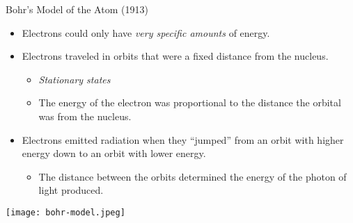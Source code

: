 \documentclass[notes]{beamer}
\begin{document}
\begin{frame}{Bohr's Model of the Atom (1913)}
	\begin{itemize}
		\item Electrons could only have \emph{very specific amounts} of
			energy.
		\item Electrons traveled in orbits that were a fixed distance
			from the nucleus.
			\begin{itemize}
				\item \emph{Stationary states}
				\item The energy of the electron was
					proportional to the distance the orbital
					was from the nucleus.
			\end{itemize}
		\item Electrons emitted radiation when they ``jumped'' from an
			orbit with higher energy down to an orbit with lower
			energy.
			\begin{itemize}
				\item The distance between the orbits determined
					the energy of the photon of light
					produced.
			\end{itemize}
	\end{itemize}
\end{frame}


\begin{frame}
	\centering

	\texttt{[image: bohr-model.jpeg]}
\end{frame}
\end{document}
